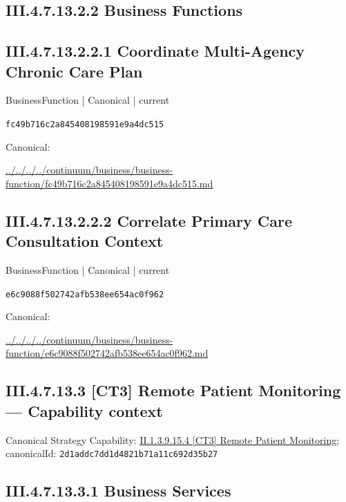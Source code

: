 \documentclass[10pt,a4paper]{article}
\begin{document}
\subsection*{III.4.7.13.2.2 Business Functions}
\subsection*{III.4.7.13.2.2.1 Coordinate Multi-Agency Chronic Care Plan}
\label{element-fc49b716c2a845408198591e9a4dc515}
{\small BusinessFunction | Canonical | current}\par
\texttt{fc49b716c2a845408198591e9a4dc515}\par
Canonical: \par
{\footnotesize\url{../../../../continuum/business/business-function/fc49b716c2a845408198591e9a4dc515.md}}\par
\subsection*{III.4.7.13.2.2.2 Correlate Primary Care Consultation Context}
\label{element-e6c9088f502742afb538ee654ac0f962}
{\small BusinessFunction | Canonical | current}\par
\texttt{e6c9088f502742afb538ee654ac0f962}\par
Canonical: \par
{\footnotesize\url{../../../../continuum/business/business-function/e6c9088f502742afb538ee654ac0f962.md}}\par
\subsection*{III.4.7.13.3 [CT3] Remote Patient Monitoring — Capability context}
Canonical Strategy Capability: \hyperref[element-2d1addc7dd1d4821b71a11c692d35b27]{II.1.3.9.15.4 [CT3] Remote Patient Monitoring}; canonicalId: \texttt{2d1addc7dd1d4821b71a11c692d35b27}\par
\subsection*{III.4.7.13.3.1 Business Services}
\end{document}
